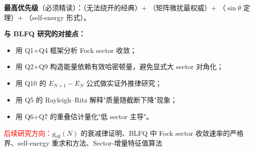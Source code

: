 \documentclass{article}
\begin{document}
\textbf{最高优先级}（必须精读）：\cite{Kato_1976}（无法绕开的经典）+ \cite{Stewart_Sun_1990}（矩阵微扰最权威）+ \cite{Davis_Kahan_1970}（$\sin\theta$ 定理）+ \cite{Feshbach_1958}（self-energy 形式）。

\textbf{与 BLFQ 研究的对接点：}
\begin{itemize}
    \item 用 Q1+Q4 框架分析 Fock sector 收敛；
    \item 用 Q2+Q9 构造能量依赖有效哈密顿量，避免显式大 sector 对角化；
    \item 用 Q10 的 $E_{N+1}-E_{N}$ 公式做实证外推律研究；
    \item 用 Q5 的 Rayleigh--Ritz 解释"质量随截断下降"现象；
    \item 用 Q6+Q7 的重叠估计量化"低 sector 主导"。
\end{itemize}

\textcolor{red}{后续研究方向：}$g_{\mathrm{eff}}(N)$ 的衰减律证明、BLFQ 中 Fock sector 收敛速率的严格界、self-energy 重求和方法、Sector-增量特征值算法

\newpage


\end{document}
